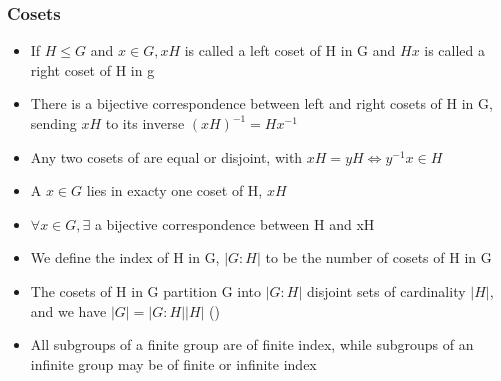 \documentclass[../Odyssey_Project.tex]{subfiles}
\begin{document}
\subsubsection*{Cosets}
\begin{itemize}
    \item If \(H \leq G\) and \(x \in G, xH\) is called a left coset of H in G and \(Hx\) is called a right coset of H in g
    \item There is a bijective correspondence between left and right cosets of H in G, sending \(xH\) to its inverse \((xH)^{-1} = Hx^{-1}\)
    \item Any two cosets of are equal or disjoint, with \(xH = yH \iff y^{-1}x \in H\)
    \item A \(x \in G\) lies in exacty one coset of H, \(xH\)
    \item \(\forall x \in G, \exists \) a bijective correspondence between H and xH
    \item We define the index of H in G, \(|G:H|\) to be the number of cosets of H in G
    \item The cosets of H in G partition G into \(|G:H|\) disjoint sets of cardinality \(|H|\), and we have \(|G| = |G:H||H|\) ()
    \item All subgroups of a finite group are of finite index, while subgroups of an infinite group may be of finite or infinite index
\end{itemize}
\end{document}
